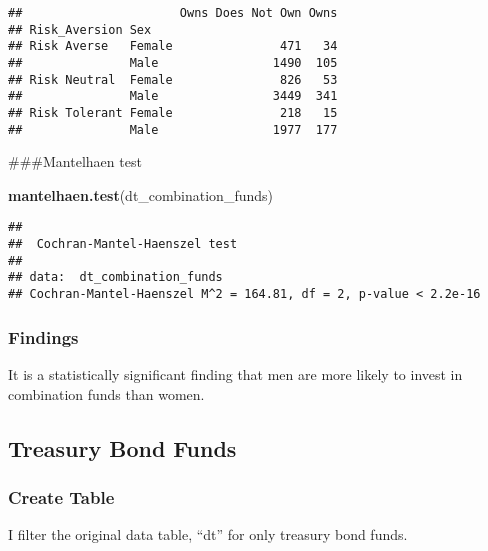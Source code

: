 \documentclass[
]{article}
\newenvironment{Shaded}{\begin{snugshade}}{\end{snugshade}}
\newcommand{\KeywordTok}[1]{\textcolor[rgb]{0.13,0.29,0.53}{\textbf{#1}}}
\newcommand{\NormalTok}[1]{#1}
\newcommand{\OperatorTok}[1]{\textcolor[rgb]{0.81,0.36,0.00}{\textbf{#1}}}
\newcommand{\StringTok}[1]{\textcolor[rgb]{0.31,0.60,0.02}{#1}}
\begin{document}
\begin{verbatim}
##                      Owns Does Not Own Owns
## Risk_Aversion Sex                          
## Risk Averse   Female               471   34
##               Male                1490  105
## Risk Neutral  Female               826   53
##               Male                3449  341
## Risk Tolerant Female               218   15
##               Male                1977  177
\end{verbatim}

\#\#\#Mantelhaen test

\begin{Shaded}
\begin{Highlighting}[]
\KeywordTok{mantelhaen.test}\NormalTok{(dt_combination_funds)}
\end{Highlighting}
\end{Shaded}

\begin{verbatim}
## 
##  Cochran-Mantel-Haenszel test
## 
## data:  dt_combination_funds
## Cochran-Mantel-Haenszel M^2 = 164.81, df = 2, p-value < 2.2e-16
\end{verbatim}

\hypertarget{findings-3}{%
\subsubsection{Findings}\label{findings-3}}

It is a statistically significant finding that men are more likely to
invest in combination funds than women.

\hypertarget{treasury-bond-funds}{%
\subsection{Treasury Bond Funds}\label{treasury-bond-funds}}

\hypertarget{create-table-3}{%
\subsubsection{Create Table}\label{create-table-3}}

I filter the original data table, ``dt'' for only treasury bond funds.

\begin{Shaded}
\end{Shaded}
\end{document}
